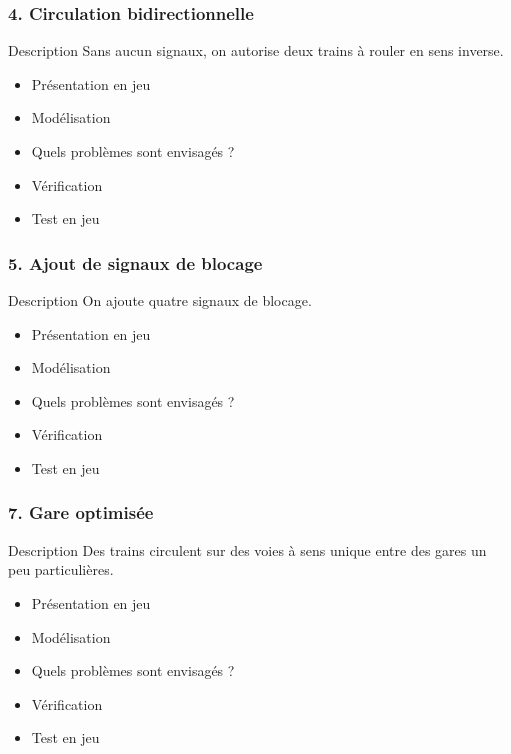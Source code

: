\documentclass[french]{beamer}
\begin{document}
\begin{frame}
  \frametitle{4. Circulation bidirectionnelle}
  \begin{block}{Description}
  Sans aucun signaux, on autorise deux trains à rouler en sens inverse.
  \end{block}

  \begin{itemize}
  \item Présentation en jeu
  \item Modélisation
  \item Quels problèmes sont envisagés ?
  \item Vérification
  \item Test en jeu
  \end{itemize}
\end{frame}

\begin{frame}
  \frametitle{5. Ajout de signaux de blocage}
  \begin{block}{Description}
  On ajoute quatre signaux de blocage.
  \end{block}

  \begin{itemize}
  \item Présentation en jeu
  \item Modélisation
  \item Quels problèmes sont envisagés ?
  \item Vérification
  \item Test en jeu
  \end{itemize}
\end{frame}

\begin{frame}
  \frametitle{7. Gare optimisée}
  \begin{block}{Description}
  Des trains circulent sur des voies à sens unique entre des gares
  un peu particulières.
  \end{block}

  \begin{itemize}
  \item Présentation en jeu
  \item Modélisation
  \item Quels problèmes sont envisagés ?
  \item Vérification
  \item Test en jeu
  \end{itemize}
\end{frame}
\end{document}
